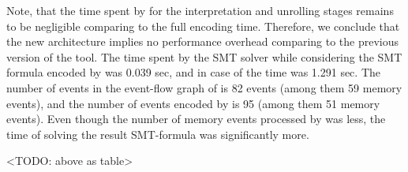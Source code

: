 
Note, that the time spent by \porthos[2] for the interpretation and unrolling stages remains to be negligible comparing to the full encoding time.
Therefore, we conclude that the new architecture implies no performance overhead comparing to the previous version of the tool.
The time spent by the SMT solver while considering the SMT formula encoded by \porthos[2] was 0.039 sec, and in case of \porthos[1] the time was 1.291 sec.
The number of events in the event-flow graph of \porthos[2] is 82 events (among them 59 memory events), and the number of events encoded by \porthos[1] is 95 (among them 51 memory events).
Even though the number of memory events processed by \porthos[1] was less, the time of solving the result SMT-formula was significantly more.

<TODO: above as table>

%


